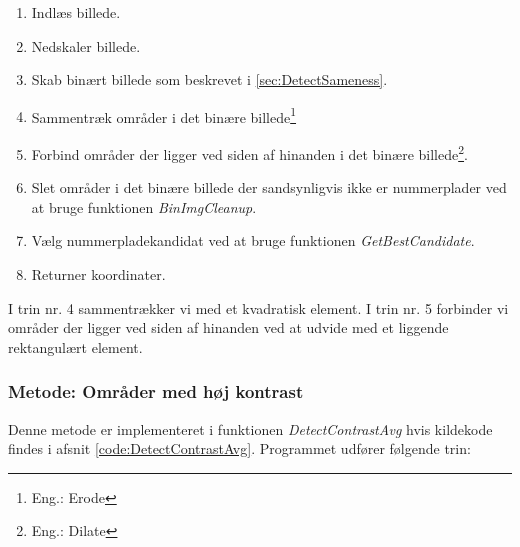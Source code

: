 \begin{enumerate}
\item Indlæs billede.
\item Nedskaler billede.
\item Skab binært billede som beskrevet i \ref{sec:DetectSameness}.
\item Sammentræk områder i det binære billede\footnote{Eng.: Erode}
\item Forbind områder der ligger ved siden af hinanden i det binære billede\footnote{Eng.: Dilate}.
\item Slet områder i det binære billede der sandsynligvis ikke er nummerplader ved at bruge funktionen \textit{BinImgCleanup}.
\item Vælg nummerpladekandidat ved at bruge funktionen \textit{GetBestCandidate}.
\item Returner koordinater.
\end{enumerate}

I trin nr. 4 sammentrækker vi med et kvadratisk element. I trin nr. 5 forbinder vi områder der ligger ved siden af hinanden ved at udvide med et liggende rektangulært element. 


\subsubsection{Metode: Områder med høj kontrast}
Denne metode er implementeret i funktionen \textit{DetectContrastAvg} hvis kildekode findes i afsnit \vref{code:DetectContrastAvg}. Programmet udfører følgende trin:


